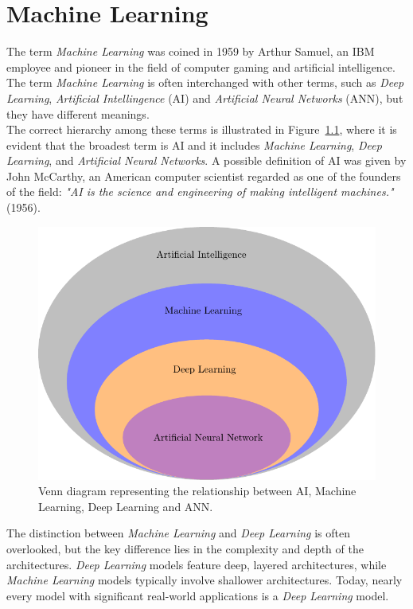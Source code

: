 
\chapter{Machine Learning}

The term \textit{Machine Learning} was coined in 1959 by Arthur Samuel, an IBM employee and pioneer in the field of computer gaming and 
artificial intelligence.
The term \textit{Machine Learning} is often interchanged with other terms, such as \textit{Deep Learning}, \textit{Artificial Intellingence} (AI) 
and \textit{Artificial Neural Networks} (ANN), but they have different meanings.\\
The correct hierarchy among these terms is illustrated in Figure~\ref{fig:venn-AI}, where it is evident that the broadest term is AI and it includes 
\textit{Machine Learning}, \textit{Deep Learning}, and \textit{Artificial Neural Networks}.
A possible definition of AI was given by John McCarthy, an American computer scientist regarded as one of the founders of the field: 
\textit{"AI is the science and engineering of making intelligent machines."} (1956).

\begin{figure}[h]
\centering
\includegraphics[scale=0.8]{Chapters/Chapter2/venn_diagram/venn.pdf}
\caption{Venn diagram representing the relationship between AI, Machine Learning, Deep Learning and ANN.}
\label{fig:venn-AI}
\end{figure}

The distinction between \textit{Machine Learning} and \textit{Deep Learning} is often overlooked, but the key difference lies 
in the complexity and depth of the architectures. \textit{Deep Learning} models feature deep, layered architectures, while \textit{Machine Learning}
models typically involve shallower architectures. Today, nearly every model with significant real-world applications is a \textit{Deep Learning} model.\\


